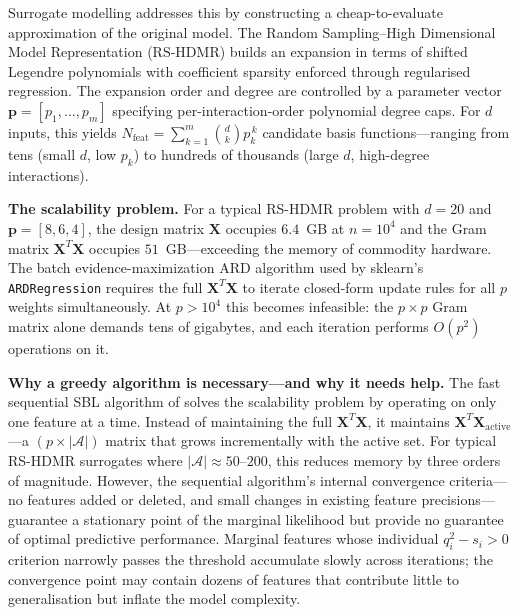 \documentclass[11pt,a4paper]{article}
\begin{document}
Surrogate modelling addresses this by constructing a cheap-to-evaluate approximation of the original model. The Random Sampling--High Dimensional Model Representation (RS-HDMR) \citep{li2002,rabitz1999} builds an expansion in terms of shifted Legendre polynomials with coefficient sparsity enforced through regularised regression. The expansion order and degree are controlled by a parameter vector $\mathbf{p} = [p_1,\dots,p_m]$ specifying per-interaction-order polynomial degree caps. For $d$ inputs, this yields $N_{\text{feat}} = \sum_{k=1}^{m} \binom{d}{k} p_k^{\,k}$ candidate basis functions---ranging from tens (small $d$, low $p_k$) to hundreds of thousands (large $d$, high-degree interactions).

\textbf{The scalability problem.}  For a typical RS-HDMR problem with $d=20$ and $\mathbf{p}=[8,6,4]$, the design matrix $\mathbf{X}$ occupies $6.4$~GB at $n=10^4$ and the Gram matrix $\mathbf{X}^T\mathbf{X}$ occupies $51$~GB---exceeding the memory of commodity hardware.  The batch evidence-maximization ARD algorithm used by sklearn's \texttt{ARDRegression} \citep{mackay1992} requires the full $\mathbf{X}^T\mathbf{X}$ to iterate closed-form update rules for all $p$ weights simultaneously.  At $p > 10^4$ this becomes infeasible: the $p \times p$ Gram matrix alone demands tens of gigabytes, and each iteration performs $O(p^2)$ operations on it.

\textbf{Why a greedy algorithm is necessary---and why it needs help.}  The fast sequential SBL algorithm of \citet{tipping2003} solves the scalability problem by operating on only one feature at a time.  Instead of maintaining the full $\mathbf{X}^T\mathbf{X}$, it maintains $\mathbf{X}^T\mathbf{X}_{\text{active}}$---a $(p \times |\mathcal{A}|)$ matrix that grows incrementally with the active set.  For typical RS-HDMR surrogates where $|\mathcal{A}| \approx 50$--$200$, this reduces memory by three orders of magnitude.  However, the sequential algorithm's internal convergence criteria---no features added or deleted, and small changes in existing feature precisions---guarantee a stationary point of the marginal likelihood but provide no guarantee of optimal predictive performance.  Marginal features whose individual $q_i^2 - s_i > 0$ criterion narrowly passes the threshold accumulate slowly across iterations; the convergence point may contain dozens of features that contribute little to generalisation but inflate the model complexity.
\end{document}
